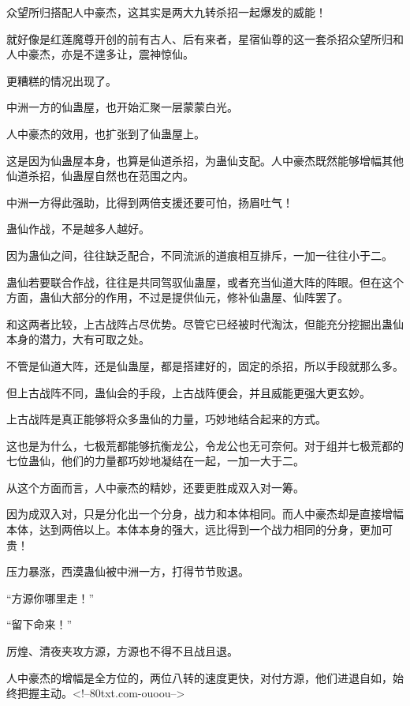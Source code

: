 \begin{this_body}
众望所归搭配人中豪杰，这其实是两大九转杀招一起爆发的威能！

就好像是红莲魔尊开创的前有古人、后有来者，星宿仙尊的这一套杀招众望所归和人中豪杰，亦是不遑多让，震神惊仙。

更糟糕的情况出现了。

中洲一方的仙蛊屋，也开始汇聚一层蒙蒙白光。

人中豪杰的效用，也扩张到了仙蛊屋上。

这是因为仙蛊屋本身，也算是仙道杀招，为蛊仙支配。人中豪杰既然能够增幅其他仙道杀招，仙蛊屋自然也在范围之内。

中洲一方得此强助，比得到两倍支援还要可怕，扬眉吐气！

蛊仙作战，不是越多人越好。

因为蛊仙之间，往往缺乏配合，不同流派的道痕相互排斥，一加一往往小于二。

蛊仙若要联合作战，往往是共同驾驭仙蛊屋，或者充当仙道大阵的阵眼。但在这个方面，蛊仙大部分的作用，不过是提供仙元，修补仙蛊屋、仙阵罢了。

和这两者比较，上古战阵占尽优势。尽管它已经被时代淘汰，但能充分挖掘出蛊仙本身的潜力，大有可取之处。

不管是仙道大阵，还是仙蛊屋，都是搭建好的，固定的杀招，所以手段就那么多。

但上古战阵不同，蛊仙会的手段，上古战阵便会，并且威能更强大更玄妙。

上古战阵是真正能够将众多蛊仙的力量，巧妙地结合起来的方式。

这也是为什么，七极荒都能够抗衡龙公，令龙公也无可奈何。对于组并七极荒都的七位蛊仙，他们的力量都巧妙地凝结在一起，一加一大于二。

从这个方面而言，人中豪杰的精妙，还要更胜成双入对一筹。

因为成双入对，只是分化出一个分身，战力和本体相同。而人中豪杰却是直接增幅本体，达到两倍以上。本体本身的强大，远比得到一个战力相同的分身，更加可贵！

压力暴涨，西漠蛊仙被中洲一方，打得节节败退。

“方源你哪里走！”

“留下命来！”

厉煌、清夜夹攻方源，方源也不得不且战且退。

人中豪杰的增幅是全方位的，两位八转的速度更快，对付方源，他们进退自如，始终把握主动。<!--80txt.com-ouoou-->

\end{this_body}

